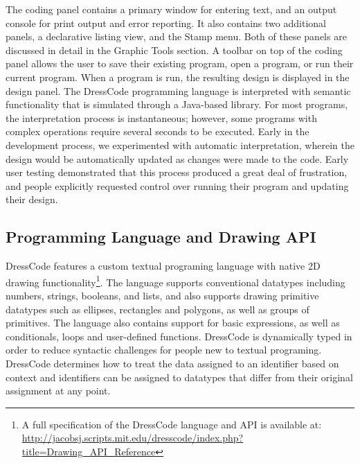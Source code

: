 \documentclass{sigchi}
\begin{document}
The coding panel contains a primary window for entering text, and an output console for print output and error reporting. It also contains two additional panels, a declarative listing view, and the Stamp menu. Both of these panels are discussed in detail in the Graphic Tools section. A toolbar on top of the coding panel allows the user to save their existing program, open a program, or run their current program. When a program is run, the resulting design is displayed in the design panel. The DressCode programming language is interpreted with semantic functionality that is simulated through a Java-based library. For most programs, the interpretation process is instantaneous; however, some programs with complex operations require several seconds to be executed. Early in the development process, we experimented with automatic interpretation, wherein the design would be automatically updated as changes were made to the code. Early user testing demonstrated that this process produced a great deal of frustration, and people explicitly requested control over running their program and updating their design.


\subsection{Programming Language and Drawing API}
DressCode features a custom textual programing language with native 2D drawing functionality\footnote{A full specification of the DressCode language and API is available at: \url{http://jacobsj.scripts.mit.edu/dresscode/index.php?title=Drawing_API_Reference}}. The language supports conventional datatypes including numbers, strings, booleans, and lists, and also supports drawing primitive datatypes such as ellipses, rectangles and polygons, as well as groups of primitives. The language also contains support for basic expressions, as well as conditionals, loops and user-defined functions. DressCode is dynamically typed in order to reduce syntactic challenges for people new to textual programing. DressCode determines how to treat the data assigned to an identifier based on context and identifiers can be assigned to datatypes that differ from their original assignment at any point. 
\end{document}
